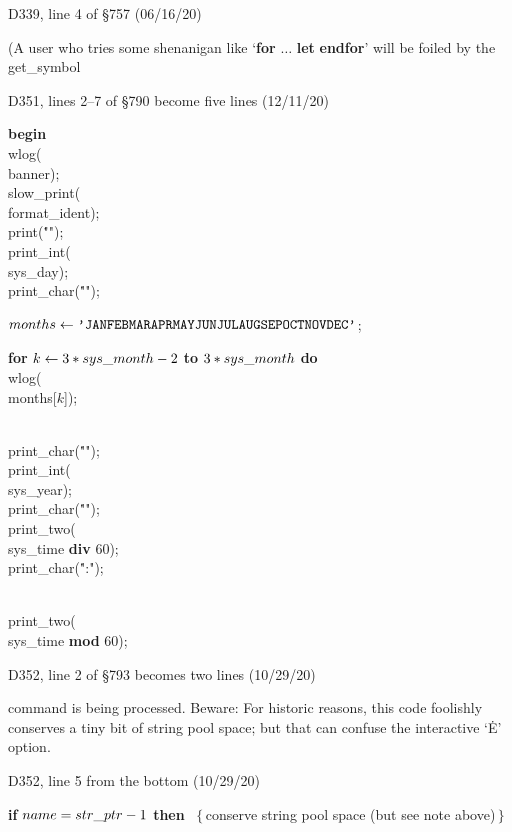 \bugonpage D339, line 4 of \S757 (06/16/20)

\tenpoint\noindent\quad
(A user who tries some shenanigan like `{\bf for} $\ldots$ {\bf let} {\bf endfor}'
will be foiled by the \\{get\_symbol}\cutpar

\bugonpage D351, lines 2--7 of \S790 become five lines (12/11/20)

\ninepoint\noindent\quad
{\bf begin} \\{wlog}(\\{banner});
\\{slow\_print}(\\{format\_ident});
\\{print}(\.{"\]\]"});
\\{print\_int}(\\{sys\_day});
\\{print\_char}(\.{"\]"});\par
\noindent\quad
$\\{months}\gets\.{\char`\'JANFEBMARAPRMAYJUNJULAUGSEPOCTNOVDEC\char`\'}$;\par
\noindent\quad
{\bf for} $k\gets3\ast\\{sys\_month}-2$ {\bf to} $3\ast\\{sys\_month}$
{\bf do} \\{wlog}(\\{months}[$k$]);\par
\noindent\quad
\\{print\_char}(\.{"\]"});
\\{print\_int}(\\{sys\_year});
\\{print\_char}(\.{"\]"});
\\{print\_two}(\\{sys\_time} {\bf div} 60);
\\{print\_char}(\.{":"});\par
\noindent\quad
\\{print\_two}(\\{sys\_time} {\bf mod} 60);

\bugonpage D352, line 2 of \S793 becomes two lines (10/29/20)

\tenpoint\noindent
command is being processed.
Beware: For historic reasons, this code foolishly conserves a tiny bit
of string pool space; but that can confuse the interactive `\.E' option.

\bugonpage D352, line 5 from the bottom (10/29/20)

\ninepoint\noindent
{\bf if} $\\{name}=\\{str\_ptr}-1$ {\bf then}
\ $\{\,$conserve string pool space (but see note above)$\,\}$

